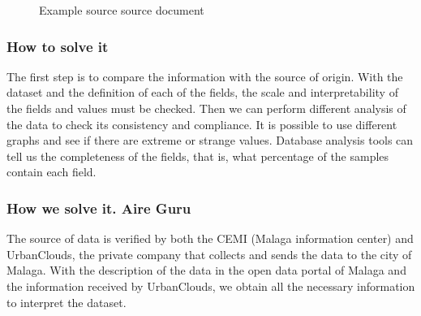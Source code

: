 \begin{figure}[ht]
\centering
{}
\caption{Example source source document}
\end{figure}

\subsubsection{How to solve it} 
The first step is to compare the information with the source of origin. With the dataset and the definition
of each of the fields, the scale and interpretability of the fields and values must be checked.
Then we can perform different analysis of the data to check its consistency and compliance.
It is possible to use different graphs and see if there are extreme or strange values.
Database analysis tools can tell us the completeness of the fields, that is, what percentage of the
samples contain each field.

\subsubsection{How we solve it. Aire Guru} 
The source of data is verified by both the CEMI (Malaga information center) and UrbanClouds, the private company
that collects and sends the data to the city of Malaga.
With the description of the data in the open data portal of Malaga and the information received by UrbanClouds,
we obtain all the necessary information to interpret the dataset. \\

